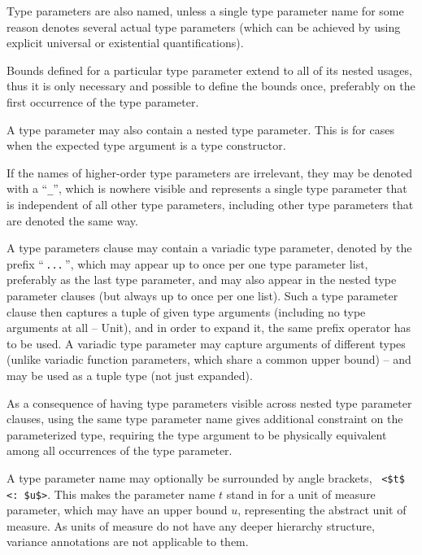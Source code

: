 Type parameters are also named, unless a single type parameter name for some reason denotes several actual type parameters (which can be achieved by using explicit universal or existential quantifications). 

Bounds defined for a particular type parameter extend to all of its nested usages, thus it is only necessary and possible to define the bounds once, preferably on the first occurrence of the type parameter. 

A type parameter may also contain a nested type parameter. This is for cases when the expected type argument is a type constructor. 

If the names of higher-order type parameters are irrelevant, they may be denoted with a ``\lstinline!_!'', which is nowhere visible and represents a single type parameter that is independent of all other type parameters, including other type parameters that are denoted the same way. 

A type parameters clause may contain a variadic type parameter, denoted by the prefix ``\,\lstinline!...!\,'', which may appear up to once per one type parameter list, preferably as the last type parameter, and may also appear in the nested type parameter clauses (but always up to once per one list). Such a type parameter clause then captures a tuple of given type arguments (including no type arguments at all -- Unit), and in order to expand it, the same prefix operator has to be used. A variadic type parameter may capture arguments of different types (unlike variadic function parameters, which share a common upper bound) -- and may be used as a tuple type (not just expanded). 

As a consequence of having type parameters visible across nested type parameter clauses, using the same type parameter name gives additional constraint on the parameterized type, requiring the type argument to be physically equivalent among all occurrences of the type parameter. 

A type parameter name may optionally be surrounded by angle brackets, ~\lstinline!<$t$ <: $u$>!. This makes the parameter name $t$ stand in for a unit of measure parameter, which may have an upper bound $u$, representing the abstract unit of measure. As units of measure do not have any deeper hierarchy structure, variance annotations are not applicable to them. 

